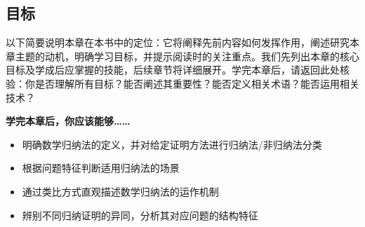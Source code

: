 \subsection{目标}

以下简要说明本章在本书中的定位：它将阐释先前内容如何发挥作用，阐述研究本章主题的动机，明确学习目标，并提示阅读时的关注重点。我们先列出本章的核心目标及学成后应掌握的技能，后续章节将详细展开。学完本章后，请返回此处核验：你是否理解所有目标？能否阐述其重要性？能否定义相关术语？能否运用相关技术？

\textbf{学完本章后，你应该能够……}

\begin{itemize}
    \item 明确数学归纳法的定义，并对给定证明方法进行归纳法/非归纳法分类
    \item 根据问题特征判断适用归纳法的场景
    \item 通过类比方式直观描述数学归纳法的运作机制
    \item 辨别不同归纳证明的异同，分析其对应问题的结构特征
\end{itemize}
